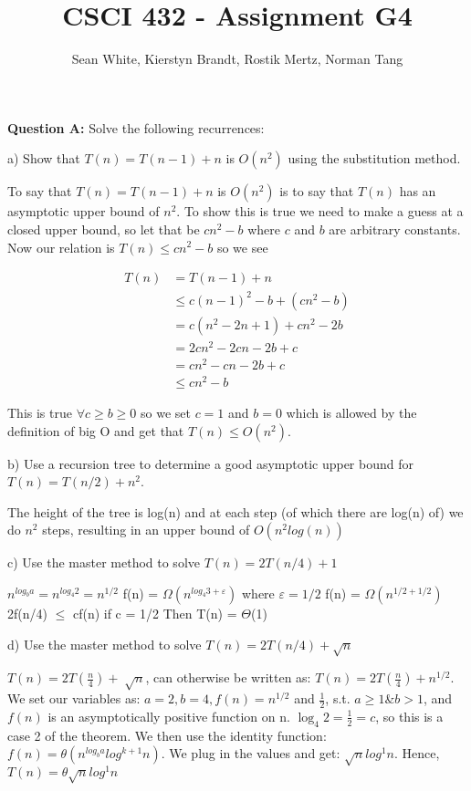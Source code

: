\documentclass[12pt]{article}
\author{Sean White, Kierstyn Brandt, Rostik Mertz, Norman Tang}
\title{CSCI 432 - Assignment G4}
\begin{document}
\maketitle

\noindent
\textbf{Question A:} Solve the following recurrences: \smallskip

a) Show that $T(n) = T(n - 1) + n$ is $O(n^2)$ using the substitution method.\smallskip

To say that $T(n) = T(n - 1) + n$ is $O(n^2)$ is to say that $T(n)$ has an asymptotic upper bound of $n^2$. To show this is true we need to make a guess at a closed upper bound, so let that be $cn^2 - b$ where $c$ and $b$ are arbitrary constants. Now our relation is $T(n) \leq cn^2 -b$ so we see

\begin{align*}
T(n) &= T(n - 1) + n\\
&\leq c(n-1)^2 - b + (cn^2 - b)\\
&= c(n^2 - 2n + 1) + cn^2 -2b\\
&= 2cn^2 - 2cn - 2b + c\\
&= cn^2 - cn - 2b + c\\
&\leq cn^2 - b
\end{align*}

This is true $\forall c \geq b \geq 0$ so we set $c = 1$ and $b = 0$ which is allowed by the definition of big O and get that $T(n) \leq O(n^2)$.
\bigskip

b) Use a recursion tree to determine a good asymptotic upper bound for $T(n) = T(n/2) + n^2$. \smallskip

The height of the tree is log(n) and at each step (of which there are log(n) of) we do $n^2$ steps, resulting in an upper bound of $O(n^2log(n))$ \bigskip

c) Use the master method to solve $T(n) = 2T(n/4) + 1$ \smallskip

 $n^{log_b a} = n^{log_4 2} = n^{1/2}$
 f(n) = $\Omega (n^{log_4 3 + \varepsilon})$ where $\varepsilon = 1/2$
 f(n) = $\Omega (n^{1/2 + 1/2})$ 
 2f(n/4) $\leq$ cf(n) if c = 1/2 
 Then T(n) = $\Theta$(1)
 \bigskip
 
d) Use the master method to solve $T(n) = 2T(n/4) + \sqrt{n}$ \smallskip

$T(n) = 2T(\frac{n}{4})+\sqrt[]{n}$, can otherwise be written as: $T(n) = 2T(\frac{n}{4})+n^{1/2}$. \\
We set our variables as: $a=2, b=4, f(n)=n^{1/2}$ and $\frac{1}{2}$, s.t. $a\geq1$\&$b>1$, and $f(n)$ is an asymptotically positive function on n. $\log_4 2 = \frac{1}{2} = c$, so this is a case 2 of the theorem. We then use the identity function: $f(n) = \theta(n^{log_ba}log^{k+1} n)$.
We plug in the values and get: $\sqrt{n}log^1n$. Hence, $T(n)= \theta\sqrt{n}log^1n$ \\
\end{document}
